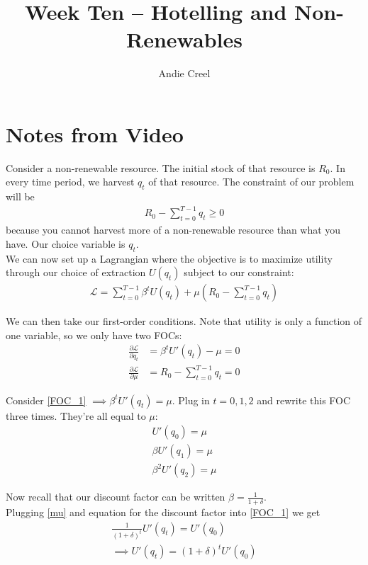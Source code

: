 \documentclass[12pt]{article}
\title{Week Ten -- Hotelling and Non-Renewables}
\author{Andie Creel}
\begin{document}
\maketitle

\section{Notes from Video}
Consider a non-renewable resource. The initial stock of that resource is $R_0$. In every time period, we harvest $q_t$ of that resource. The constraint of our problem will be 
\begin{align}
    R_0 - \sum_{t=0}^{T-1}q_t \geq 0
\end{align}
because you cannot harvest more of a non-renewable resource than what you have. Our choice variable is $q_t$. \\

We can now set up a Lagrangian where the objective is to maximize utility through our choice of extraction $U(q_t)$ subject to our constraint:
\begin{align}
    \mathcal{L} = \sum_{t=0}^{T-1} \beta^t U(q_t) + \mu (R_0 - \sum_{t=0}^{T-1} q_t)
\end{align}

We can then take our first-order conditions. Note that utility is only a function of one variable, so we only have two FOCs: 
\begin{align}
    \frac{\partial \mathcal{L}}{ \partial q_t} &= \beta^t U'(q_t) - \mu = 0 \label{FOC_1}\\
    \frac{\partial \mathcal{L}}{ \partial \mu} &= R_0 - \sum_{t=0}^{T-1} q_t= 0
\end{align}

Consider \ref{FOC_1} $\implies \beta^t U'(q_t) = \mu$. Plug in $t= 0,1,2$ and rewrite this FOC three times. They're all equal to $\mu$:
\begin{align}
    U'(q_0) = \mu \label{mu}\\
    \beta U'(q_1) = \mu \\
    \beta^2U'(q_2) = \mu
\end{align}

Now recall that our discount factor can be written $\beta = \frac{1}{1 + \delta}$. \\

Plugging \ref{mu} and equation for the discount factor into \ref{FOC_1} we get
\begin{align}
    \frac{1}{(1 + \delta)^t} U'(q_t) = U'(q_0)\\
    \implies U'(q_t) = (1+ \delta)^t U'(q_0) \label{marg_ut}
\end{align}
\end{document}
